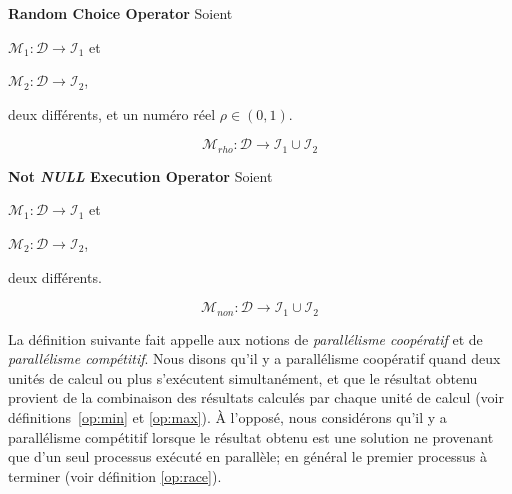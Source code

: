 \begin{definition}\label{op:rho}
{\bf Random Choice Operator} Soient
\begin{inparaenum}[i)]
	\item $\mathcal{M}_1 : \mathcal{D} \rightarrow \mathcal{I}_1$ et
	\item $\mathcal{M}_2 : \mathcal{D} \rightarrow \mathcal{I}_2$,
\end{inparaenum} 
deux \ms{} différents, et un numéro réel $\rho \in (0,1)$. 

\[
\mathcal{M}_{rho}:\mathcal{D} \rightarrow \mathcal{I}_1 \cup \mathcal{I}_2 
\]
\end{definition}

\begin{definition}\label{op:or}
{\bf Not {\it NULL} Execution Operator} Soient
\begin{inparaenum}[i)]
	\item $\mathcal{M}_1 : \mathcal{D} \rightarrow \mathcal{I}_1$ et  
	\item $\mathcal{M}_2 : \mathcal{D} \rightarrow \mathcal{I}_2$,
\end{inparaenum} 
deux \ms{} différents. 

\[
\mathcal{M}_{non}:\mathcal{D} \rightarrow \mathcal{I}_1 \cup \mathcal{I}_2 
\]
\end{definition}

La définition suivante  fait appelle aux notions  de {\it parallélisme coopératif} et de {\it parallélisme compétitif}. Nous disons qu'il y a  parallélisme  coopératif  quand  deux  unités  de  calcul  ou  plus s'exécutent simultanément, et que le résultat obtenu provient de la combinaison des  résultats calculés par  chaque unité de  calcul (voir définitions~\ref{op:min} et \ref{op:max}). À l'opposé, nous  considérons qu'il y  a parallélisme compétitif  lorsque le résultat obtenu  est une solution ne provenant  que d'un seul processus exécuté  en parallèle; en  général   le  premier   processus  à  terminer   (voir  définition \ref{op:race}). 

